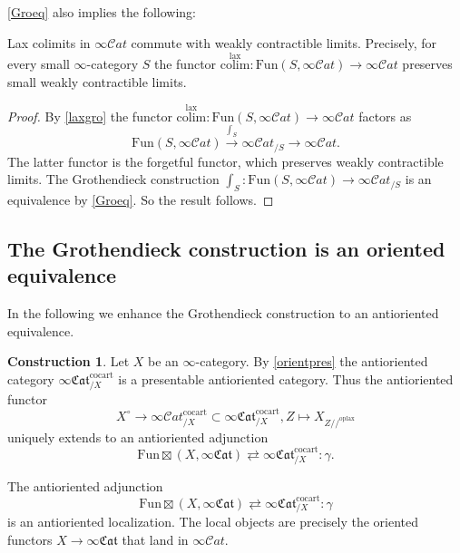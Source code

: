 \documentclass[10pt,oneside]{article}
\numberwithin{equation}{section} %
\numberwithin{figure}{section} %
\theoremstyle{plain}
\theoremstyle{definition}
\newtheorem{construction}[thm]{Construction}
\newcommand{\colim}{\mathrm{colim}}
\newcommand{\Fun}{\mathrm{Fun}}
\newcommand{\cocart}{{\mathrm{cocart}}}
\newcommand{\lax}{{\mathrm{lax}}}
\newcommand{\oplax}{{\mathrm{oplax}}}
\newcommand{\scat}{\mathcal{C}\mathit{at}}
\newcommand{\fcat}{\mathfrak{Cat}}
\begin{document}
\cref{Groeq} also implies the following:

\begin{corollary}Lax colimits in $\infty\scat$ commute with weakly contractible limits.
Precisely, for every small $\infty$-category $S$ the functor
$\overset{\lax}{\colim}: \Fun(S,\infty\scat) \to \infty\scat $
preserves small weakly contractible limits.
    
\end{corollary}

\begin{proof}

By \cref{laxgro} the functor $\overset{\lax}{\colim}: \Fun(S,\infty\scat) \to \infty\scat $ factors as $$\Fun(S,\infty\scat) \xrightarrow{\int_S} \infty\scat_{/S} \to \infty\scat.$$ The latter functor is the forgetful functor, which preserves weakly contractible limits.
The Grothendieck construction $\int_S: \Fun(S,\infty\scat) \xrightarrow{} \infty\scat_{/S}$ is an equivalence by \cref{Groeq}. So the result follows.
\end{proof}

\subsection{The Grothendieck construction is an oriented equivalence}

In the following we enhance the Grothendieck construction to an antioriented equivalence.

\begin{construction}

Let $X$ be an $\infty$-category.
By \cref{orientpres} the antioriented category $ \infty\mathfrak{Cat}_{/X}^\cocart $
is a presentable antioriented category.
Thus the antioriented functor
$$ X^\circ \xrightarrow{} \infty\scat_{/X}^\cocart  \subset \infty\mathfrak{Cat}_{/X}^\cocart, Z \mapsto X_{Z//^\oplax} $$
uniquely extends to an antioriented adjunction
$${\Fun\boxtimes}(X,\infty\mathfrak{Cat}) \rightleftarrows \infty\mathfrak{Cat}_{/X}^\cocart: \gamma. $$

\end{construction}

\begin{theorem}\label{Groori}

The antioriented adjunction
$${\Fun\boxtimes}(X,\infty\mathfrak{Cat}) \rightleftarrows \infty\mathfrak{Cat}_{/X}^\cocart: \gamma $$
is an antioriented localization.
The local objects are precisely the oriented functors
$X \to \infty \fcat$ that land in $\infty\scat.$
    
\end{theorem}
\end{document}
